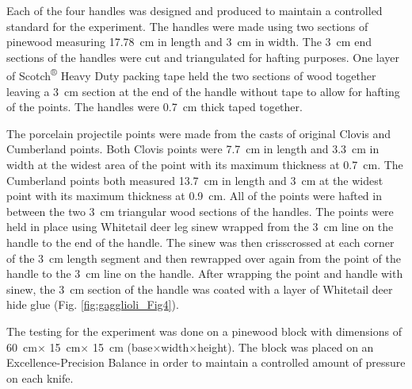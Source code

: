 Each of the four handles was designed and produced to maintain a controlled standard for the experiment. 
The handles were made using two sections of pinewood measuring \SI{17.78}{\centi\metre} in length and \SI{3}{\centi\metre} in width. The \SI{3}{\centi\metre} end sections of the handles were cut and triangulated for hafting purposes. 
One layer of Scotch\textsuperscript{®} Heavy Duty packing tape held the two sections of wood together leaving a \SI{3}{\centi\metre} section at the end of the handle without tape to allow for hafting of the points. The handles were \SI{0.7}{\centi\meter} thick taped together.  

The porcelain projectile points were made from the casts of original Clovis and Cumberland points. Both Clovis points were \SI{7.7}{\centi\metre} in length and \SI{3.3}{\centi\metre} in width at the widest area of the point with its maximum thickness at \SI{0.7}{\centi\metre}. The Cumberland points both measured \SI{13.7}{\centi\metre} in length and \SI{3}{\centi\metre} at the widest point with its maximum thickness at \SI{0.9}{\centi\metre}. All of the points were hafted in between the two \SI{3}{\centi\metre} triangular wood sections of the handles. The points were held in place using Whitetail deer leg sinew wrapped from the \SI{3}{\centi\metre} line on the handle to the end of the handle. The sinew was then crisscrossed at each corner of the \SI{3}{\centi\metre} length segment and then rewrapped over again from the point of the handle to the \SI{3}{\centi\metre} line on the handle. After wrapping the point and handle with sinew, the \SI{3}{\centi\metre} section of the handle was coated with a layer of Whitetail deer hide glue (Fig. \ref{fig:gagglioli_Fig4}). 


The testing for the experiment was done on a pinewood block with dimensions of \SI{60}{\centi\metre}$\times$ \SI{15}{\centi\metre}$\times$ \SI{15}{\centi\metre} (base$\times$width$\times$height). The block was placed on an Excellence-Precision Balance in order to maintain a controlled amount of pressure on each knife.

